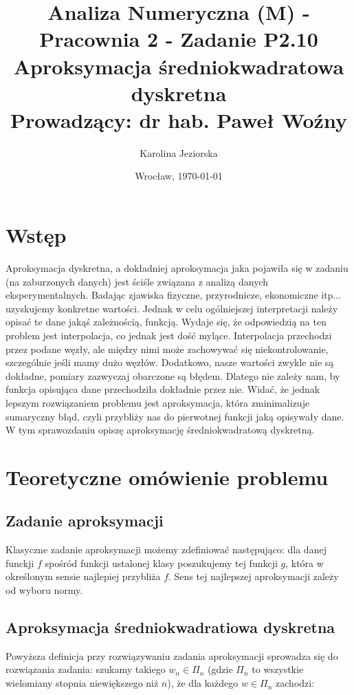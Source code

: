 \documentclass[11pt]{article}
\date{Wrocław, \today}
\title{\LARGE\textbf{Analiza Numeryczna (M) - Pracownia 2 - Zadanie P2.10}\\Aproksymacja średniokwadratowa dyskretna\\ \normalsize{Prowadzący: dr hab. Paweł Woźny}}
\author{Karolina Jeziorska}
\begin{document}
\maketitle



\thispagestyle{empty}     
\tableofcontents   

\section{Wstęp}
Aproksymacja dyskretna, a dokładniej aproksymacja jaka pojawiła się w zadaniu (na zaburzonych danych) jest ściśle związana z analizą danych  eksperymentalnych. Badając zjawiska fizyczne, przyrodnicze, ekonomiczne itp... uzyskujemy konkretne wartości. Jednak w celu ogólniejszej interpretacji należy opisać te dane jakąś zależnością, funkcją. Wydaje się, że odpowiedzią na ten problem jest interpolacja, co jednak jest dość mylące. Interpolacja przechodzi przez podane węzły, ale między nimi może zachowywać się niekontrolowanie, szczególnie jeśli mamy dużo węzłów. Dodatkowo, nasze wartości zwykle nie są dokładne, pomiary zazwyczaj obarczone są błędem. Dlatego nie zależy nam, by funkcja opisująca dane przechodziła dokładnie przez nie. Widać, że jednak lepszym rozwiązaniem problemu jest aproksymacja, która zminimalizuje sumaryczny błąd, czyli przybliży nas do pierwotnej funkcji jaką opisywały dane. W tym sprawozdaniu opiszę aproksymację średniokwadratową dyskretną.

\section{Teoretyczne omówienie problemu}
\subsection{Zadanie aproksymacji}
Klasyczne zadanie aproksymacji możemy zdefiniować następująco: dla danej funckji $f$ spośród funkcji ustalonej klasy poszukujemy tej funkcji $g$, która w określonym sensie najlepiej przybliża $f$. Sens tej najlepszej aproksymacji zależy od wyboru normy.

\subsection{Aproksymacja średniokwadratiowa dyskretna}
Powyższa definicja przy rozwiązywaniu zadania aproksymacji sprowadza się do rozwiązania zadania: szukamy takiego $w_n \in \Pi_n$ (gdzie $\Pi_n$ to wszystkie wielomiany stopnia niewiększego niż $n$), że dla każdego $w \in \Pi_n$ zachodzi:
\end{document}
